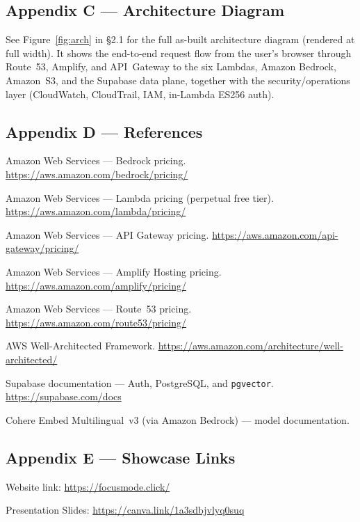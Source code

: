 \documentclass[a4paper,11pt]{article}
\begin{document}
	\subsection{Appendix C --- Architecture Diagram}
	See Figure~\ref{fig:arch} in \S2.1 for the full as-built architecture diagram (rendered at
	full width). It shows the end-to-end request flow from the user's browser through Route~53,
	Amplify, and API~Gateway to the six Lambdas, Amazon Bedrock, Amazon~S3, and the Supabase
	data plane, together with the security/operations layer (CloudWatch, CloudTrail, IAM,
	in-Lambda ES256 auth).

	\subsection{Appendix D --- References}
	\begin{enumerate}[label={[}\arabic*{]}]
		\item Amazon Web Services --- Bedrock pricing. \url{https://aws.amazon.com/bedrock/pricing/}
		\item Amazon Web Services --- Lambda pricing (perpetual free tier).
		      \url{https://aws.amazon.com/lambda/pricing/}
		\item Amazon Web Services --- API Gateway pricing.
		      \url{https://aws.amazon.com/api-gateway/pricing/}
		\item Amazon Web Services --- Amplify Hosting pricing.
		      \url{https://aws.amazon.com/amplify/pricing/}
		\item Amazon Web Services --- Route~53 pricing.
		      \url{https://aws.amazon.com/route53/pricing/}
		\item AWS Well-Architected Framework.
		      \url{https://aws.amazon.com/architecture/well-architected/}
		\item Supabase documentation --- Auth, PostgreSQL, and \texttt{pgvector}.
		      \url{https://supabase.com/docs}
		\item Cohere Embed Multilingual~v3 (via Amazon Bedrock) --- model documentation.
	\end{enumerate}

	\subsection{Appendix E --- Showcase Links}
	\begin{enumerate}[label={[}\arabic*{]}]
		\item Website link: \url{https://focusmode.click/}
		\item Presentation Slides: \url{https://canva.link/1a3sdbjvlyq0suq}
		
	\end{enumerate}
\end{document}
